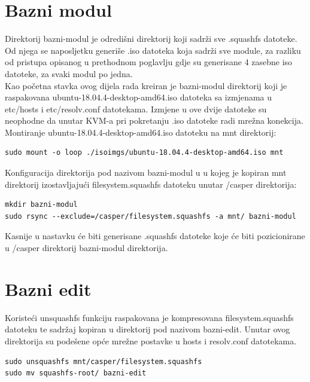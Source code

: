\documentclass[12pt,vi]{mitthesis}
\begin{document}
\section*{Bazni modul}
\indent
Direktorij bazni-modul je odredišni direktorij koji sadrži sve .squashfs datoteke. Od njega se naposljetku generiše .iso datoteka koja sadrži sve module, za razliku od pristupa opisanog u prethodnom poglavlju gdje su generisane 4 zasebne iso datoteke, za svaki modul po jedna.\\
Kao početna stavka ovog dijela rada kreiran je bazni-modul direktorij koji je raspakovana ubuntu-18.04.4-desktop-amd64.iso datoteka sa izmjenama u etc/hosts i etc/resolv.conf datotekama. Izmjene u ove dvije datoteke su neophodne da unutar KVM-a pri pokretanju .iso datoteke radi mrežna konekcija.\\
Montiranje ubuntu-18.04.4-desktop-amd64.iso datoteku na mnt direktorij:
\begin{lstlisting}[style=BashInputStyle]
sudo mount -o loop ./isoimgs/ubuntu-18.04.4-desktop-amd64.iso mnt
\end{lstlisting}

Konfiguracija direktorija pod nazivom bazni-modul u u kojeg je kopiran mnt direktorij izostavljajući filesystem.squashfs datoteku unutar /casper direktorija:
\begin{lstlisting}[style=BashInputStyle]
mkdir bazni-modul
sudo rsync --exclude=/casper/filesystem.squashfs -a mnt/ bazni-modul
\end{lstlisting}
Kasnije u nastavku će biti generisane .squashfs datoteke koje će biti pozicionirane u /casper direktorij bazni-modul direktorija.

\section*{Bazni edit}
\indent
Koristeći unsquashfs funkciju raspakovana je kompresovana filesystem.squashfs datoteku te sadržaj kopiran u direktorij pod nazivom bazni-edit. Unutar ovog direktorija su podešene opće mrežne postavke u hosts i resolv.conf datotekama.
\begin{lstlisting}[style=BashInputStyle]
sudo unsquashfs mnt/casper/filesystem.squashfs
sudo mv squashfs-root/ bazni-edit
\end{lstlisting}
\end{document}
